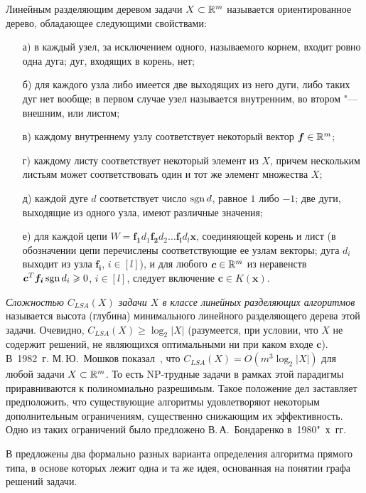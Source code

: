 \begin{definition} %
	Линейным  разделяющим деревом задачи $X \subset \mathbb{R}^m$ называется ориентированное дерево, обладающее следующими свойствами:
	\begin{itemize}
		\item[а)] 
		в каждый узел, за исключением одного, называемого  корнем,
		входит ровно одна дуга; дуг, входящих в корень, нет;
		\item[б)] 
		для каждого узла либо имеется две выходящих из него  дуги,
		либо таких дуг  нет  вообще;   в  первом  случае  узел  называется
		внутренним, во втором "--- внешним, или листом;
		\item[в)] 
		каждому внутреннему узлу соответствует некоторый вектор $\bm{f} \in \mathbb{R}^m$;
		\item[г)] 
		каждому листу соответствует некоторый элемент из $X$, причем нескольким листьям может соответствовать один и тот же элемент множества $X$;
		\item[д)] 
		каждой дуге $d$ соответствует число  $\operatorname{sgn} d$, равное $1$ либо $-1$;
		две дуги, выходящие из одного узла, имеют различные значения;
		\item[е)] 
		для каждой цепи $W = \bm{f_1} d_1 \bm{f_2} d_2 \ldots \bm{f_l} d_l \bm{x}$, соединяющей корень и лист (в обозначении  цепи  перечислены  соответствующие  ее  узлам векторы; дуга $d_i$ выходит из узла $\bm{f_i}$, $i\in[l]$), и для любого $\bm{c}\in \mathbb{R}^m$ из неравенств $\bm{c}^T \bm{f_i} \operatorname{sgn} d_i\geqslant 0$, $i\in[l]$, следует включение $\bm{c}\in K(\bm{x})$.
	\end{itemize}
\end{definition}

\emph{Сложностью $C_{LSA}(X)$ задачи $X$ в классе линейных разделяющих алгоритмов}
называется высота (глубина) минимального линейного разделяющего дерева этой задачи.
Очевидно, $C_{LSA}(X) \ge \log_2 |X|$ (разумеется, при условии, 
что $X$ не содержит решений, не являющихся оптимальными ни при каком входе $\bm{c}$).
В~1982~г. М.\,Ю.~Мошков показал~\cite{Moshkov:1982}, что $C_{LSA}(X) = O (m^3 \log_2 |X|)$ для любой задачи $X\subset\mathbb{R}^m$. То есть NP-трудные задачи в рамках этой парадигмы приравниваются к полиномиально разрешимым.
Такое положение дел заставляет предположить, 
что существующие алгоритмы удовлетворяют некоторым дополнительным ограничениям,
существенно снижающим их эффективность.
Одно из таких ограничений было предложено В.\,А.~Бондаренко в~1980"~х~гг.

В \cite{BondBook:1995} предложены два формально разных варианта определения
алгоритма прямого типа, в основе которых лежит одна и та же идея,
основанная на понятии графа решений задачи.

